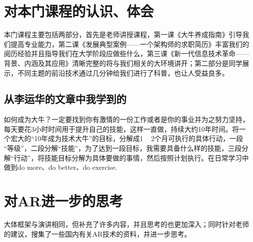 \documentclass{article}
\begin{document}
\section{对本门课程的认识、体会}
本门课程主要包括两部分，首先是老师讲授课程，第一课《大牛养成指南》引导我们提高专业能力，第二课《发展典型案例——一个架构师的求职简历》丰富我们的阅历经验并且指导我们在大学阶段应做些什么，第三课《新一代信息技术革命——背景、内涵及其应用》清晰完整的将与我们相关的大环境讲开；第二部分是同学展示，不同主题的前沿技术通过几分钟给我们进行了科普，也让人受益良多。
\par

\subsection{从李运华的文章中我学到的}
如何成为大牛？一定要找到你有激情的一份工作或者是你的事业并为之努力坚持，每天要花3小时时间用于提升自己的技能，这样一直做，持续大约10年时间。将一个宏大的“10年成为技术大牛”的目标，分解成1 ~ 2个月可执行的具体行动，一段 “等级”，二段分解“技能”，为了达到一段目标，我需要具备什么样的技能，三段分解“行动”，将技能目标分解为具体要做的事情，然后按照计划执行。在日常学习中做到do more、do better、do exercise.\par

\section{对AR进一步的思考}
大体框架与演讲相同，但补充了许多内容，并且思考的也更加深入；同时针对老师的建议，搜集了一些国内有关AR技术的资料，并进一步思考。
\end{document}
